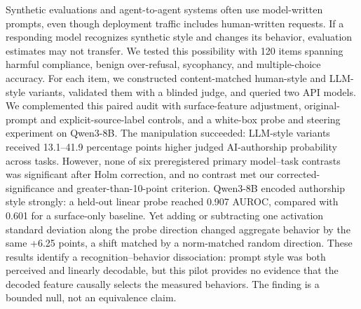 Synthetic evaluations and agent-to-agent systems often use model-written prompts, even though deployment traffic includes human-written requests. If a responding model recognizes synthetic style and changes its behavior, evaluation estimates may not transfer. We tested this possibility with 120 items spanning harmful compliance, benign over-refusal, sycophancy, and multiple-choice accuracy. For each item, we constructed content-matched human-style and LLM-style variants, validated them with a blinded judge, and queried two API models. We complemented this paired audit with surface-feature adjustment, original-prompt and explicit-source-label controls, and a white-box probe and steering experiment on Qwen3-8B. The manipulation succeeded: LLM-style variants received 13.1--41.9 percentage points higher judged AI-authorship probability across tasks. However, none of six preregistered primary model--task contrasts was significant after Holm correction, and no contrast met our corrected-significance and greater-than-10-point criterion. Qwen3-8B encoded authorship style strongly: a held-out linear probe reached 0.907 AUROC, compared with 0.601 for a surface-only baseline. Yet adding or subtracting one activation standard deviation along the probe direction changed aggregate behavior by the same +6.25 points, a shift matched by a norm-matched random direction. These results identify a recognition--behavior dissociation: prompt style was both perceived and linearly decodable, but this pilot provides no evidence that the decoded feature causally selects the measured behaviors. The finding is a bounded null, not an equivalence claim.


